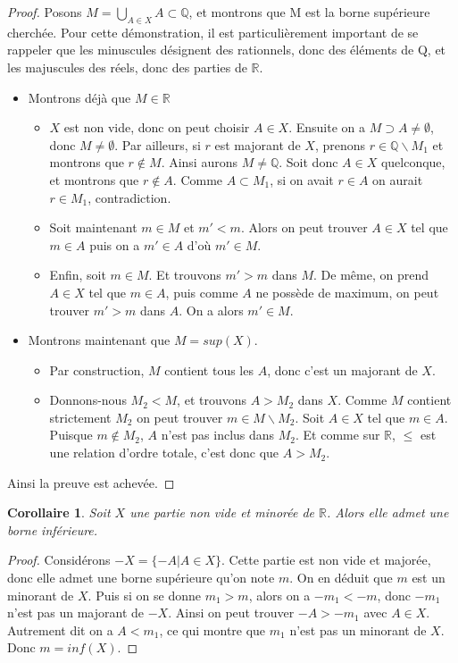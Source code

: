 \documentclass[french]{book}
\newcommand{\R}{\mathbb{R}}
\theoremstyle{plain}
\newtheorem{cor}{Corollaire}[chapter]
\theoremstyle{definition}
\theoremstyle{remark}
\begin{document}
\begin{proof}
	Posons $\displaystyle M = \bigcup_{A\in X}A\subset\mathbb{Q}$, et montrons que M est la borne supérieure cherchée. Pour cette démonstration, il est particulièrement important de se rappeler que les minuscules
désignent des rationnels, donc des éléments de Q, et les majuscules des réels, donc des parties de $\R$.
\begin{itemize}
	\item Montrons déjà que $M \in \mathbb{R}$
	\begin{itemize}
		\item[--]$X$ est non vide, donc on peut choisir $A \in X$. Ensuite on a $M \supset A \neq \emptyset$, donc $M \neq \emptyset$. Par ailleurs, si $r$ est majorant de $X$, prenons $r \in \mathbb{Q} \backslash M_1$ et montrons que $r \notin M$. Ainsi aurons $M \neq \mathbb{Q}$. Soit donc $A \in X$ quelconque, et montrons que $r \notin A$. Comme $A \subset M_1$, si on avait $r \in A$ on aurait $r \in M_1$, contradiction.
		\item[--]Soit maintenant $m \in M$ et $m' < m$. Alors on peut trouver $A \in X$ tel que $m \in A$ puis on a $m' \in A$ d'où $m' \in M$.
		\item[--]Enfin, soit $m \in M$. Et trouvons $m' > m$ dans $M$. De même, on prend $A \in X$ tel que $m \in A$, puis comme $A$ ne possède de maximum, on peut trouver $m' > m$ dans $A$. On a alors $m' \in M$.
	\end{itemize}
	\item Montrons maintenant que $M = sup(X)$.
	\begin{itemize}
		\item[--]Par construction, $M$ contient tous les $A$, donc c'est un majorant de $X$.
		\item[--]Donnons-nous $M_2 < M$, et trouvons $A > M_2$ dans $X$. Comme $M$ contient strictement $M_2$ on peut trouver $m \in M \backslash M_2$. Soit $A \in X$ tel que $m \in A$. Puisque $m \notin M_2$, $A$ n'est pas inclus dans $M_2$. Et comme sur $\mathbb{R}$, $\leqslant$ est une relation d'ordre totale, c'est donc que $A > M_2$.
	\end{itemize}
\end{itemize}
Ainsi la preuve est achevée.
\end{proof}
\begin{cor}
	Soit $X$ une partie non vide et minorée de $\mathbb{R}$. Alors elle admet une borne inférieure.
\end{cor}
\begin{proof}
	Considérons $-X = \{-A | A \in X\}$. Cette partie est non vide et majorée, donc elle admet une borne supérieure qu'on note $m$. On en déduit que $m$ est un minorant de $X$. Puis si on se donne $m_1 > m$, alors on a $-m_1 < -m$, donc $-m_1$ n'est pas un majorant de $-X$. Ainsi on peut trouver $-A > -m_1$ avec $A \in X$. Autrement dit on a $A < m_1$, ce qui montre que $m_1$ n'est pas un minorant de $X$. Donc $m = inf(X)$.
\end{proof}
\end{document}

